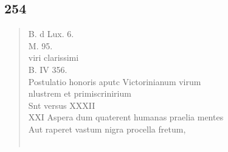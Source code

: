 \documentclass[11pt, a4paper]{report}
\begin{document}
            \subsection*{254}
      \begin{verse}
      B. d Lux. 6. \\ M. 95. \\ viri clarissimi \\ B. IV 356. \\ Postulatio honoris aputc Victorinianum virum \\ nlustrem et primiscrinirium \\ Snt versus XXXII \\  \lbrack XXI \rbrack  Aspera dum quaterent humanas praelia mentes \\ Aut raperet vastum nigra procella fretum, \\ 
        ﻿\pagebreak 

\end{verse}
\end{document}

